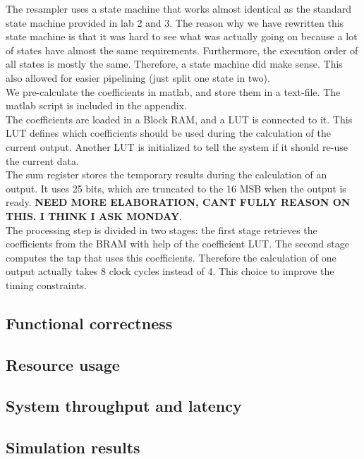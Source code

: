\documentclass[a4paper,twoside,11pt, fleqn]{article}
\begin{document}
The resampler uses a state machine that works almost identical as the standard state machine provided in lab 2 and 3. The reason why we have rewritten this state machine is that it was hard to see what was actually going on because a lot of states have almost the same requirements. Furthermore, the execution order of all states is mostly the same. Therefore, a state machine did make sense. This also allowed for easier pipelining (just split one state in two).\\

We pre-calculate the coefficients in matlab, and store them in a text-file. The matlab script is included in the appendix.\\

The coefficients are loaded in a Block RAM, and a LUT is connected to it. This LUT defines which coefficients should be used during the calculation of the current output. Another LUT is initialized to tell the system if it should re-use the current data.\\

The sum register stores the temporary results during the calculation of an output. It uses 25 bits, which are truncated to the 16 MSB when the output is ready. 
\textbf{NEED MORE ELABORATION, CANT FULLY REASON ON THIS. I THINK I ASK MONDAY}.\\

The processing step is divided in two stages: the first stage retrieves the coefficients from the BRAM with help of the coefficient LUT. The second stage computes the tap that uses this coefficients. Therefore the calculation of one output actually takes 8 clock cycles instead of 4. This choice to improve the timing constraints.\\



\subsection{Functional correctness}

\subsection{Resource usage}

\subsection{System throughput and latency}

\subsection{Simulation results}
\end{document}
